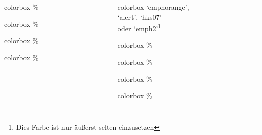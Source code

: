 \documentclass[german,notoc,draft]{tudbeamer}%
\begin{document}
\begin{frame}
\begin{columns}[T,onlytextwidth]
\begin{column}{.19\textwidth}
			\begin{beamercolorbox}[wd=0.9\textwidth,sep=1em]{colorbox}
				\%
		    \end{beamercolorbox}
			\begin{beamercolorbox}[wd=0.9\textwidth,sep=1em]{colorbox}
				\%
		    \end{beamercolorbox}
			\begin{beamercolorbox}[wd=0.9\textwidth,sep=1em]{colorbox}
				\%
		    \end{beamercolorbox}
			\begin{beamercolorbox}[wd=0.9\textwidth,sep=1em]{colorbox}
				\%
		    \end{beamercolorbox}
		\end{column}
		\begin{column}{.19\textwidth}%
			\begin{beamercolorbox}[wd=0.9\textwidth,sep=1em]{colorbox}
				\centering `emphorange',\\ `alert', `hks07'\\ oder `emph2'\footnote[frame]{Dies Farbe ist nur äußerst selten einzusetzen}
		    \end{beamercolorbox}
			\begin{beamercolorbox}[wd=0.9\textwidth,sep=1em]{colorbox}
				\%
		    \end{beamercolorbox}
			\begin{beamercolorbox}[wd=0.9\textwidth,sep=1em]{colorbox}
				\%
		    \end{beamercolorbox}
			\begin{beamercolorbox}[wd=0.9\textwidth,sep=1em]{colorbox}
				\%
		    \end{beamercolorbox}
			\begin{beamercolorbox}[wd=0.9\textwidth,sep=1em]{colorbox}
				\%
		    \end{beamercolorbox}
		\end{column}
	\end{columns}
\end{frame}
\end{document}
